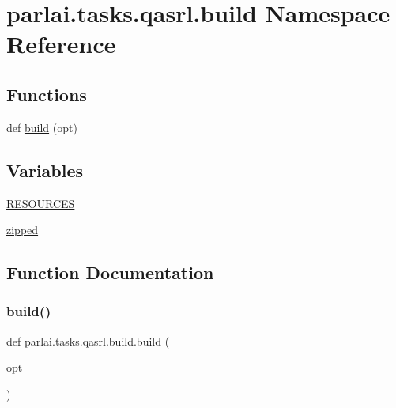 \hypertarget{namespaceparlai_1_1tasks_1_1qasrl_1_1build}{}\section{parlai.\+tasks.\+qasrl.\+build Namespace Reference}
\label{namespaceparlai_1_1tasks_1_1qasrl_1_1build}
\subsection*{Functions}
\begin{DoxyCompactItemize}
\item 
def \hyperlink{namespaceparlai_1_1tasks_1_1qasrl_1_1build_afe77ee1662611aab5f5520df1fc49ff6}{build} (opt)
\end{DoxyCompactItemize}
\subsection*{Variables}
\begin{DoxyCompactItemize}
\item 
\hyperlink{namespaceparlai_1_1tasks_1_1qasrl_1_1build_a04e7b9e28ecdcb659118ff07cffbef7a}{R\+E\+S\+O\+U\+R\+C\+ES}
\item 
\hyperlink{namespaceparlai_1_1tasks_1_1qasrl_1_1build_aa4f2e0d96fec9dd5f644823f78375fc4}{zipped}
\end{DoxyCompactItemize}


\subsection{Function Documentation}
\mbox{\label{namespaceparlai_1_1tasks_1_1qasrl_1_1build_afe77ee1662611aab5f5520df1fc49ff6}} 
\subsubsection{\texorpdfstring{build()}{build()}}
{\footnotesize\ttfamily def parlai.\+tasks.\+qasrl.\+build.\+build (\begin{DoxyParamCaption}\item[{}]{opt }\end{DoxyParamCaption})}




